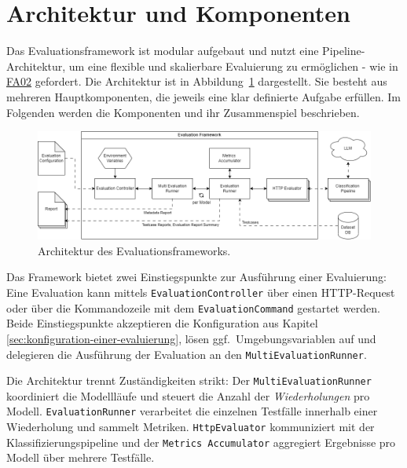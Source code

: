\section{Architektur und Komponenten}\label{sec:architektur-und-komponenten}

Das Evaluationsframework ist modular aufgebaut und nutzt eine Pipeline-Archi\-tektur, um eine flexible und skalierbare Evaluierung zu ermöglichen - wie in \hyperlink{FA02}{FA02} gefordert. Die Architektur ist in Abbildung~\ref{fig:evaluation-framework-architecture} dargestellt. Sie besteht aus mehreren Hauptkomponenten, die jeweils eine klar definierte Aufgabe erfüllen. Im Folgenden werden die Komponenten und ihr Zusammenspiel beschrieben.

\begin{figure}[h]
    \centering
    \includegraphics[width=\linewidth]{images/evaluation/evaluation-framework-architecture.drawio}
    \caption{Architektur des Evaluationsframeworks.}
    \label{fig:evaluation-framework-architecture}
\end{figure}

Das Framework bietet zwei Einstiegspunkte zur Ausführung einer Evaluierung: Eine Evaluation kann mittels \texttt{EvaluationController} über einen HTTP-Request oder über die Kommandozeile mit dem \texttt{EvaluationCommand} gestartet werden. Beide Einstiegspunkte akzeptieren die Konfiguration aus Kapitel \ref{sec:konfiguration-einer-evaluierung}, lösen ggf.\ Umgebungsvariablen auf und delegieren die Ausführung der Evaluation an den \texttt{MultiEvaluationRunner}.

Die Architektur trennt Zuständigkeiten strikt: Der \texttt{MultiEvaluationRunner} koordiniert die Modellläufe und steuert die Anzahl der \emph{Wiederholungen} pro Modell. \texttt{EvaluationRunner} verarbeitet die einzelnen Testfälle innerhalb einer Wiederholung und sammelt Metriken. \texttt{HttpEvaluator} kommuniziert mit der Klassifizierungspipeline und der \texttt{Metrics Accumulator} aggregiert Ergebnisse pro Modell über mehrere Testfälle.